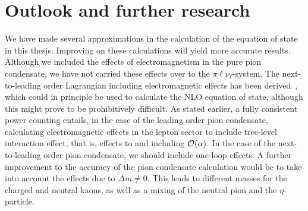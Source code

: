 \section{Outlook and further research}



We have made several approximations in the calculation of the equation of state in this thesis.
Improving on these calculations will yield more accurate results.
Although we included the effects of electromagnetism in the pure pion condensate, we have not carried these effects over to the $\pi\ell\nu_\ell$-system.
The next-to-leading order Lagrangian including electromagnetic effects has been derived~\autocite{urechVirtualPhotonsChiral1995}, which could in principle be used to calculate the NLO equation of state, although this might prove to be prohibitively difficult.
As stated earlier, a fully consistent power counting entails, in the case of the leading order pion condensate, calculating electromagnetic effects in the lepton sector to include tree-level interaction effect, that is, effects to and including $\mathcal O(\alpha)$.
In the case of the next-to-leading order pion condensate, we should include one-loop effects.
A further improvement to the accuracy of the pion condensate calculation would be to take into account the effects due to $\Delta m \neq 0$.
This leads to different masses for the charged and neutral kaons, as well as a mixing of the neutral pion and the $\eta$-particle.



